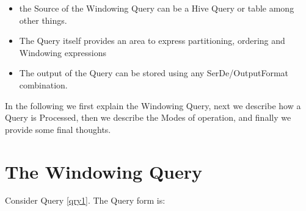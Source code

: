 \documentclass[pdftex,10pt,a4paper]{article}
\begin{document}
\begin{itemize}
\item the Source of the Windowing Query can be a Hive Query or table
  among other things.
\item The Query itself provides an area to express partitioning,
  ordering and Windowing expressions
\item The output of the Query can be stored using any
  SerDe/OutputFormat combination.
\end{itemize}

In the following we first explain the Windowing Query, next we
describe how a Query is Processed, then we describe the Modes of
operation, and finally we provide some final thoughts.

  \section{The Windowing Query}
  Consider Query \ref{qry1}. The Query form is:
\end{document}
